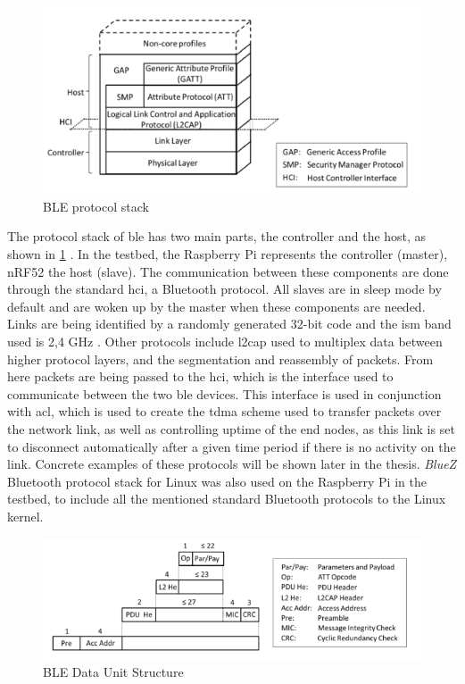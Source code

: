 \begin{figure}[ht]
    \centering
    \includegraphics[scale=0.7]{BLEprotocolStack.png}    
    \caption{BLE protocol stack \cite{gomez2012overview}}
    \label{fig:BLEprotocolStack}
\end{figure}

\noindent The protocol stack of \gls{ble} has two main parts, the controller and the host, as shown in \ref{fig:BLEprotocolStack} \cite{gomez2012overview}. In the testbed, the \gls{Raspberry Pi} represents the controller (master), \gls{nRF52} the host (slave). The communication between these components are done through the standard \gls{hci}, a Bluetooth protocol. All slaves are in sleep mode by default and are woken up by the master when these components are needed. Links are being identified by a randomly generated 32-bit code and the \gls{ism} band used is 2,4 GHz \cite{gomez2012overview}. Other protocols include \gls{l2cap} used to multiplex data between higher protocol layers, and the segmentation and reassembly of packets. From here packets are being passed to the \gls{hci}, which is the interface used to communicate between the two \gls{ble} devices. This interface is used in conjunction with \gls{acl}, which is used to create the \gls{tdma} scheme used to transfer packets over the network link, as well as controlling uptime of the end nodes, as this link is set to disconnect automatically after a given time period if there is no activity on the link. Concrete examples of these protocols will be shown later in the thesis.  \textit{BlueZ} Bluetooth protocol stack for Linux \cite{bluez32} was also used on the \gls{Raspberry Pi} in the testbed, to include all the mentioned standard Bluetooth protocols to the Linux kernel. 



\begin{figure}[ht]
    \centering
    \includegraphics[scale=0.7]{BLEdataUnitStructure.png}    
    \caption{BLE Data Unit Structure \cite{gomez2012overview}}
    \label{fig:BLEdataUnitStructure}
\end{figure}

